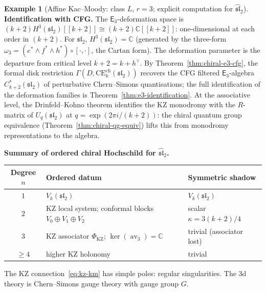 \documentclass[11pt,reqno]{amsart}
\theoremstyle{definition}
\newtheorem{example}[theorem]{Example}
\theoremstyle{remark}
\newcommand{\CE}{\mathrm{CE}}
\providecommand{\Ethree}{\mathsf{E}_{3}}
\DeclareMathOperator{\av}{av}
\newcommand{\CC}{\mathbb{C}}
\numberwithin{equation}{section}
\begin{document}
\begin{example}[Affine Kac--Moody: class $L$, $r = 3$;
explicit computation for $\widehat{\mathfrak{sl}}_2$]
\smallskip
\noindent\textbf{Identification with CFG.}
The $\Ethree$-deformation space is
$(k+2) H^3(\mathfrak{sl}_2)[[k+2]]
\cong (k+2)\CC[[k+2]]$:
one-dimensional at each order in $(k+2)$.
For $\mathfrak{sl}_2$,
$H^3(\mathfrak{sl}_2) = \CC$ (generated by the
three-form $\omega_3 = (e^* \wedge f^* \wedge h^*) \circ
[\cdot, \cdot]$, the Cartan form).
The deformation parameter is the departure from critical
level $k + 2 = k + h^\vee$.
By Theorem~\ref{thm:chiral-e3-cfg}, the formal disk
restriction $\Gamma(D, \CE^{\mathrm{ch}}_k(\mathfrak{sl}_2))$
recovers the CFG filtered $\Ethree$-algebra
$C^*_{k+2}(\mathfrak{sl}_2)$ of perturbative Chern--Simons
quantisations; the full identification of the deformation
families is Theorem~\ref{thm:e3-identification}.
At the associative level, the Drinfeld--Kohno theorem
identifies the KZ monodromy with the $R$-matrix of
$U_q(\mathfrak{sl}_2)$ at $q = \exp(2\pi i/(k + 2))$:
the chiral quantum group equivalence
(Theorem~\ref{thm:chiral-qg-equiv}) lifts this from
monodromy representations to the algebra.

\smallskip
\noindent\textbf{Summary of ordered chiral Hochschild for
$\widehat{\mathfrak{sl}}_2$.}
\begin{center}
\begin{tabular}{@{} c l l @{}}
\toprule
Degree $n$ & Ordered datum & Symmetric shadow \\
\midrule
$1$ & $V_k(\mathfrak{sl}_2)$ & $V_k(\mathfrak{sl}_2)$ \\
$2$ & KZ local system; conformal blocks
      $V_0 \oplus V_1 \oplus V_2$
    & scalar $\kappa = 3(k+2)/4$ \\
$3$ & KZ associator $\Phi_{\mathrm{KZ}}$;
      $\ker(\av_3) = \CC$
    & trivial (associator lost) \\
$\geq 4$ & higher KZ holonomy
    & trivial \\
\bottomrule
\end{tabular}
\end{center}

The KZ connection~\eqref{eq:kz-km} has simple poles:
regular singularities. The $3$d theory is Chern--Simons
gauge theory with gauge group $G$.
\end{example}
\end{document}
